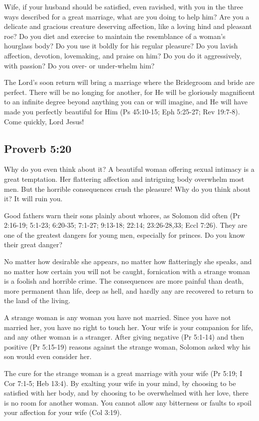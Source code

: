 Wife, if your husband should be satisfied, even ravished, with you in the three ways described for a great marriage, what are you doing to help him? Are you a delicate and gracious creature deserving affection, like a loving hind and pleasant roe? Do you diet and exercise to maintain the resemblance of a woman’s hourglass body? Do you use it boldly for his regular pleasure? Do you lavish affection, devotion, lovemaking, and praise on him? Do you do it aggressively, with passion? Do you over- or under-whelm him?

The Lord’s soon return will bring a marriage where the Bridegroom and bride are perfect. There will be no longing for another, for He will be gloriously magnificent to an infinite degree beyond anything you can or will imagine, and He will have made you perfectly beautiful for Him (Ps 45:10-15; Eph 5:25-27; Rev 19:7-8). Come quickly, Lord Jesus!

\subsection{Proverb 5:20}
Why do you even think about it? A beautiful woman offering sexual intimacy is a great temptation. Her flattering affection and intriguing body overwhelm most men. But the horrible consequences crush the pleasure! Why do you think about it? It will ruin you.

Good fathers warn their sons plainly about whores, as Solomon did often (Pr 2:16-19; 5:1-23; 6:20-35; 7:1-27; 9:13-18; 22:14; 23:26-28,33; Eccl 7:26). They are one of the greatest dangers for young men, especially for princes. Do you know their great danger?

No matter how desirable she appears, no matter how flatteringly she speaks, and no matter how certain you will not be caught, fornication with a strange woman is a foolish and horrible crime. The consequences are more painful than death, more permanent than life, deep as hell, and hardly any are recovered to return to the land of the living.

A strange woman is any woman you have not married. Since you have not married her, you have no right to touch her. Your wife is your companion for life, and any other woman is a stranger. After giving negative (Pr 5:1-14) and then positive (Pr 5:15-19) reasons against the strange woman, Solomon asked why his son would even consider her.

The cure for the strange woman is a great marriage with your wife (Pr 5:19; I Cor 7:1-5; Heb 13:4). By exalting your wife in your mind, by choosing to be satisfied with her body, and by choosing to be overwhelmed with her love, there is no room for another woman. You cannot allow any bitterness or faults to spoil your affection for your wife (Col 3:19).

